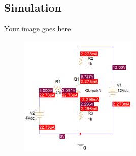 \subsection{Simulation}
Your image goes here
\begin{figure}[h]
    \centering
    \includegraphics[width=0.5\textwidth]{graphics/ex8/f1.PNG}
\end{figure}
